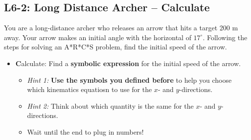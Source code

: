 \documentclass[]{article}
\begin{document}
\begin{PresentSpace}
\vspace{-10pt}
\section*{L6-2: Long Distance Archer -- Calculate}
\vspace{-10pt}
You are a long-distance archer who releases an arrow that hits a target 200 m away. Your arrow makes an initial angle with the horizontal of $17^{\circ}$. Following the steps for solving an A*R*C*S problem, find the initial speed of the arrow.
\begin{itemize}
	\item \textbf{C}alculate: Find a \textbf{symbolic expression} for the initial speed of the arrow.
	\begin{itemize}
		\item \textit{Hint 1:} \textbf{Use the symbols you defined before} to help you choose which kinematics equatiosn to use for the $x$- and $y$-directions.
		\item \textit{Hint 2:} Think about which quantity is the same for the $x$- and $y$-directions.
		\item Wait until the end to plug in numbers!
	\end{itemize}
\end{itemize}
\end{PresentSpace}
\newpage
\end{document}
